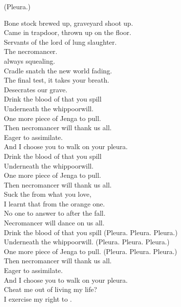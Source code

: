 
(Pleura.)

Bone stock brewed up, graveyard shoot up. \\
Came in trapdoor, thrown up on the floor. \\
Servants of the lord of lung slaughter. \\
The necromancer. \\

 always squealing. \\
Cradle snatch the new world fading. \\
The final test, it takes your breath. \\
Desecrates our grave. \\

Drink the blood of that you spill \\
Underneath the whippoorwill. \\
One more piece of Jenga to pull. \\
Then necromancer will thank us all. \\

Eager to assimilate. \\
And I choose you to walk on your pleura. \\

Drink the blood of that you spill \\
Underneath the whippoorwill. \\
One more piece of Jenga to pull. \\
Then necromancer will thank us all. \\

Suck the  from what you love, \\
I learnt that from the orange one. \\
No one to answer to after the fall. \\
Necromancer will dance on us all. \\

Drink the blood of that you spill (Pleura. Pleura. Pleura.) \\
Underneath the whippoorwill. (Pleura. Pleura. Pleura.) \\
One more piece of Jenga to pull. (Pleura. Pleura. Pleura.) \\
Then necromancer will thank us all. \\

Eager to assimilate. \\
And I choose you to walk on your pleura. \\
Cheat me out of living my life? \\
I exercise my right to . \\

